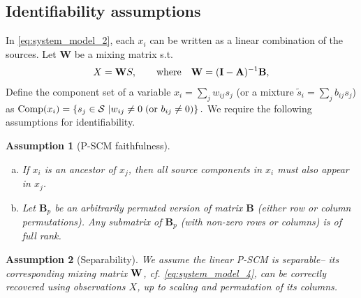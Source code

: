 \documentclass[12pt]{article}
\newtheorem{assumption}{Assumption}
\newcommand{\bA}{\mathbf{A}}
\newcommand{\bB}{\mathbf{B}}
\newcommand{\bW}{\mathbf{W}}
\newcommand{\bI}{\mathbf{I}}
\begin{document}
\subsection{Identifiability assumptions} \label{sec:model_assumptions} \vspace{-2mm}
In \eqref{eq:system_model_2}, each $x_i$ can be written as a linear combination of the sources.
Let $\mathbf{W}$ be a mixing matrix s.t.
\vspace{-2mm}
\begin{align}
\label{eq:system_model_4}
X=\bW S,\qquad \text{where}\quad \bW = (\bI - \bA)^{-1} \bB,\vspace{-2mm}
\end{align}
Define the component set of a variable $x_i=\sum_{j} w_{ij} s_j$ (or a mixture $\tilde{s}_i=\sum_{j} b_{ij} s_j$) as
$ {\rm{Comp}}(x_i) = \left\{s_j\in \mathcal{S}~| w_{ij}\neq 0 \;(\text{or } b_{ij}\neq 0)\right\}.$
We require the following assumptions for identifiability.
\begin{assumption}[P-SCM faithfulness] \label{assumption:faithfulness}
\begin{enumerate}[(a)]
\itemsep0em
\item If $x_i$ is an ancestor of $x_j$, then all source components in $x_i$ must also appear in $x_j$. 
\vspace{-1mm}
\item Let $\bB_p$ be an arbitrarily permuted version of matrix $\bB$ (either row or column permutations). Any submatrix of $\bB_p$ (with non-zero rows or columns) is of full rank.
\end{enumerate}
\end{assumption}
\vspace{-1mm}



\vspace{-3mm}
\begin{assumption}[Separability]\label{assumption:separability}
We assume the linear P-SCM is separable-- its corresponding mixing matrix $\bf{W}$, cf. \eqref{eq:system_model_4}, can be correctly recovered using observations $X$, up to scaling and permutation of its columns.
\end{assumption}
\vspace{-2mm}
\end{document}
